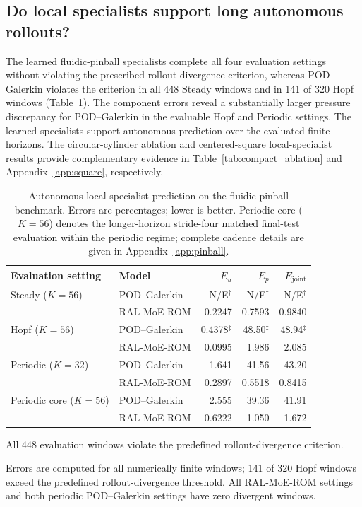 \subsection{Do local specialists support long autonomous rollouts?}

The learned fluidic-pinball specialists complete all four evaluation settings
without violating the prescribed rollout-divergence criterion, whereas
POD--Galerkin violates the criterion in all 448 Steady windows and in
141 of 320 Hopf windows (Table~\ref{tab:pinball_autonomous}).
The component errors reveal a substantially larger pressure discrepancy for
POD--Galerkin in the evaluable Hopf and Periodic settings. The learned
specialists support autonomous prediction over the evaluated finite horizons.
The circular-cylinder ablation and centered-square local-specialist results
provide complementary evidence in Table~\ref{tab:compact_ablation} and
Appendix~\ref{app:square}, respectively.

\begin{table}[t]
\centering
\caption{Autonomous local-specialist prediction on the fluidic-pinball benchmark.
Errors are percentages; lower is better. Periodic core ($K=56$) denotes the
longer-horizon stride-four matched final-test evaluation within the periodic
regime; complete cadence details are given in Appendix~\ref{app:pinball}.}
\label{tab:pinball_autonomous}
\small
\setlength{\tabcolsep}{5pt}
\begin{threeparttable}
\begin{tabular}{@{}llrrr@{}}
\toprule
Evaluation setting & Model & $E_u$ & $E_p$ & $E_{\mathrm{joint}}$ \\
\midrule
Steady ($K=56$) & POD--Galerkin & N/E$^\dagger$ & N/E$^\dagger$ & N/E$^\dagger$ \\
 & RAL-MoE-ROM & 0.2247 & 0.7593 & 0.9840 \\
\addlinespace
Hopf ($K=56$) & POD--Galerkin & 0.4378$^\ddagger$ & 48.50$^\ddagger$ & 48.94$^\ddagger$ \\
 & RAL-MoE-ROM & 0.0995 & 1.986 & 2.085 \\
\addlinespace
Periodic ($K=32$) & POD--Galerkin & 1.641 & 41.56 & 43.20 \\
 & RAL-MoE-ROM & 0.2897 & 0.5518 & 0.8415 \\
\addlinespace
Periodic core ($K=56$) & POD--Galerkin & 2.555 & 39.36 & 41.91 \\
 & RAL-MoE-ROM & 0.6222 & 1.050 & 1.672 \\
\bottomrule
\end{tabular}
\begin{tablenotes}[flushleft]
\footnotesize
\item[$\dagger$] All 448 evaluation windows violate the predefined rollout-divergence criterion.
\item[$\ddagger$] Errors are computed for all numerically finite windows;
141 of 320 Hopf windows exceed the predefined rollout-divergence threshold.
All RAL-MoE-ROM settings and both periodic POD--Galerkin settings have zero divergent windows.
\end{tablenotes}
\end{threeparttable}
\end{table}

